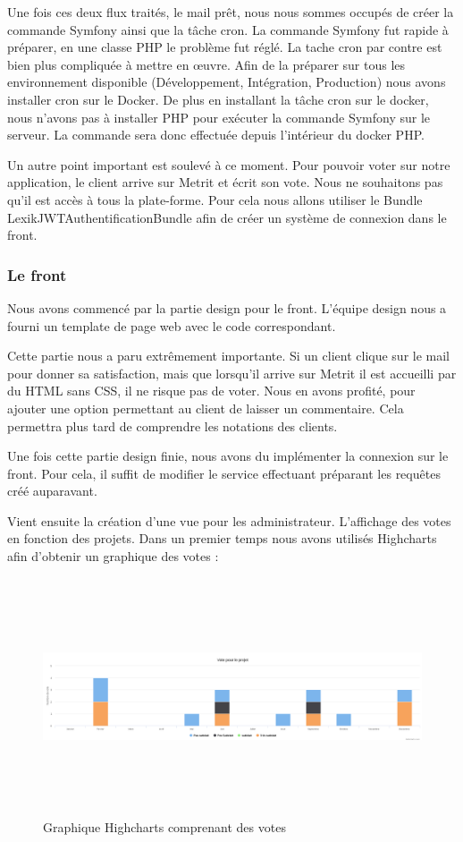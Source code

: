 \documentclass[12pt, twoside, openright]{report}
\begin{document}
Une fois ces deux flux traités, le mail prêt, nous nous sommes occupés de créer la commande Symfony ainsi que la tâche cron. La commande Symfony fut rapide à préparer, en une classe PHP le problème fut réglé. La tache cron par contre est bien plus compliquée à mettre en œuvre. Afin de la préparer sur tous les environnement disponible (Développement, Intégration, Production) nous avons installer cron sur le Docker. De plus en installant la tâche cron sur le docker, nous n'avons pas à installer PHP pour exécuter la commande Symfony sur le serveur. La commande sera donc effectuée depuis l'intérieur du docker PHP. 

Un autre point important est soulevé à ce moment. Pour pouvoir voter sur notre application, le client arrive sur Metrit et écrit son vote. Nous ne souhaitons pas qu'il est accès à tous la plate-forme. Pour cela nous allons utiliser le Bundle LexikJWTAuthentificationBundle afin de créer un système de connexion dans le front. 

\subsubsection{Le front}

Nous avons commencé par la partie design pour le front. L'équipe design nous a fourni un template de page web avec le code correspondant.

Cette partie nous a paru extrêmement importante. Si un client clique sur le mail pour donner sa satisfaction, mais que lorsqu'il arrive sur Metrit il est accueilli par du HTML sans CSS, il ne risque pas de voter. Nous en avons profité, pour ajouter une option permettant au client de laisser un commentaire. Cela permettra plus tard de comprendre les notations des clients. 

Une fois cette partie design finie, nous avons du implémenter la connexion sur le front. Pour cela, il suffit de modifier le service effectuant préparant les requêtes créé auparavant. 

Vient ensuite la création d'une vue pour les administrateur. L'affichage des votes en fonction des projets. Dans un premier temps nous avons utilisés Highcharts afin d'obtenir un graphique des votes :
\begin{figure}
\centering
\includegraphics[width=17cm, height=7cm]{img/graphique-high-chart.PNG}
\caption{Graphique Highcharts comprenant des votes}
\end{figure}
\end{document}
